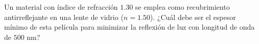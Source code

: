 \item Un material con índice de refracción $1.30$ se emplea como recubrimiento antirreflejante en una lente de vidrio ($n = 1.50$). ¿Cuál debe ser el espesor mínimo de esta película para minimizar la reflexión de luz con longitud de onda de $500\text{ nm}$?